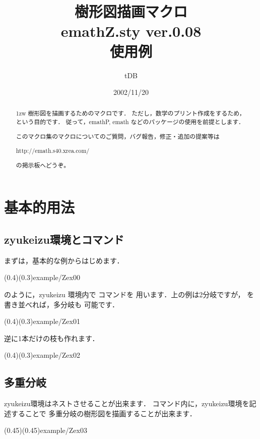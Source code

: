 \documentclass[a4j]{jarticle}
\begin{document}
\title{樹形図描画マクロ\\
emathZ.sty {\normalsize ver.0.08}\\使用例}
\author{tDB}
\date{2002/11/20}

\maketitle\thispagestyle{empty}
\begin{abstract}%
\parindent1zw%
樹形図を描画するためのマクロです．
ただし，数学のプリント作成をするため，という目的です．
従って，emathP, emath などのパッケージの使用を前提とします．

このマクロ集のマクロについてのご質問，バグ報告，修正・追加の提案等は
\begin{center}
http://emath.s40.xrea.com/
\end{center}
の掲示板へどうぞ。
\end{abstract}
\pagebreak
{}%

\tableofcontents

\pagebreak


\section{基本的用法}
\subsection{\textsf{zyukeizu}環境とコマンド}
まずは，基本的な例からはじめます．

\showexample[基本例](0.4)(0.3){example/Zex00}

\noindent のように，\textsf{zyukeizu} 環境内で  コマンドを
用います．上の例は2分岐ですが， を書き並べれば，多分岐も
可能です．

\showexample[多分岐](0.4)(0.3){example/Zex01}

逆に1本だけの枝も作れます．

\showexample[一分岐](0.4)(0.3){example/Zex02}
\clearpage

\subsection{多重分岐}
\textsf{zyukeizu}環境はネストさせることが出来ます．
コマンド内に，\textsf{zyukeizu}環境を記述することで
多重分岐の樹形図を描画することが出来ます．

\showexample[多重分岐](0.45)(0.45){example/Zex03}
\clearpage
\end{document}
